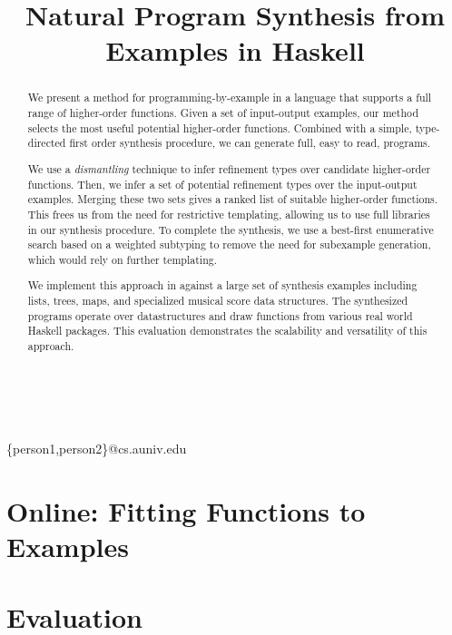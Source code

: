 \documentclass[pldi]{sigplanconf-pldi16}
\begin{document}
\title{Natural Program Synthesis from Examples in Haskell}

%
%

{ \\
  \\
}
{\{person1,person2\}@cs.auniv.edu}


\maketitle

\begin{abstract}
We present a method for programming-by-example in a language that supports a full range of higher-order functions.
Given a set of input-output examples, our method selects the most useful potential higher-order functions.
Combined with a simple, type-directed first order synthesis procedure, we can generate full, easy to read, programs.

We use a \textit{dismantling} technique to infer refinement types over candidate higher-order functions.
Then, we infer a set of potential refinement types over the input-output examples.
Merging these two sets gives a ranked list of suitable higher-order functions.
This frees us from the need for restrictive templating, allowing us to use full libraries in our synthesis procedure.
To complete the synthesis, we use a best-first enumerative search based on a weighted subtyping to remove the need for subexample generation, which would rely on further templating.

We implement this approach in \ourTool against a large set of synthesis examples including lists, trees, maps, and specialized musical score data structures.
The synthesized programs operate over datastructures and draw functions from various real world Haskell packages.
This evaluation demonstrates the scalability and versatility of this approach.
\end{abstract}











\section{Online: Fitting Functions to Examples} \label{synth}


\section{Evaluation}\label{evaluation}








\end{document}
